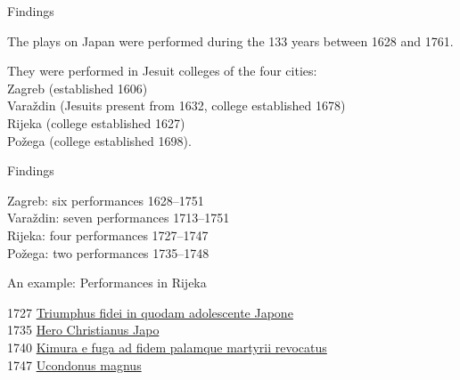 \documentclass[14pt]{beamer}
\begin{document}
\begin{frame}{Findings}

The plays on Japan were performed during the 133 years between 1628 and 1761. 

They were performed in Jesuit colleges of the four cities:\\
\alert{Zagreb} (established 1606)\\
\alert{Varaždin} (Jesuits present from 1632, college established 1678)\\
\alert{Rijeka} (college established 1627)\\
\alert{Požega} (college established 1698).

\end{frame}

{
    \begin{frame}[plain]
    \end{frame}
    }

\begin{frame}{Findings}

Zagreb: \alert{six} performances 1628–1751\\
Varaždin: \alert{seven} performances 1713–1751\\
Rijeka: \alert{four} performances 1727–1747\\
Požega: \alert{two} performances 1735–1748

\end{frame}

\begin{frame}{An example: Performances in Rijeka}

\alert{1727} \href{http://solr.ffzg.hr/basex/dramata/croala.drama.d1e20464}{Triumphus fidei in quodam adolescente Japone}\\
\alert{1735} \href{http://solr.ffzg.hr/basex/dramata/croala.drama.d1e25068}{Hero Christianus Japo}\\
\alert{1740} \href{http://solr.ffzg.hr/basex/dramata/croala.drama.d1e27940}{Kimura e fuga ad fidem palamque martyrii revocatus}\\
\alert{1747} \href{http://solr.ffzg.hr/basex/dramata/croala.drama.d1e32238}{Ucondonus magnus}

\end{frame}
\end{document}
